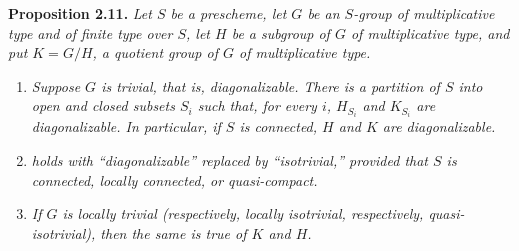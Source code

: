 \medskip
\noindent{}\textbf{Proposition 2.11.}
\textit{Let \(S\) be a prescheme, let \(G\) be an \(S\)-group of
multiplicative type and of finite type over \(S\), let \(H\) be a subgroup
of \(G\) of multiplicative type, and put \(K=G/H\), a quotient group of
\(G\) of multiplicative type.}
\begin{enumerate}
  \item[(i)]
  \textit{Suppose \(G\) is trivial, that is, diagonalizable. There is a
  partition of \(S\) into open and closed subsets \(S_i\) such that, for
  every \(i\), \(H_{S_i}\) and \(K_{S_i}\) are diagonalizable. In
  particular, if \(S\) is connected, \(H\) and \(K\) are
  diagonalizable.}

  \item[(ii)]
  \textit{ holds with ``diagonalizable'' replaced by
  ``isotrivial,'' provided that \(S\) is connected, locally connected, or
  quasi-compact.}

  \item[(iii)]
  \textit{If \(G\) is locally trivial (respectively, locally isotrivial,
  respectively, quasi-isotrivial), then the same is true of \(K\) and
  \(H\).}
\end{enumerate}

